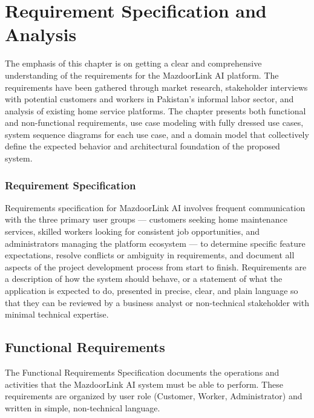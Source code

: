 \documentclass[12pt,a4paper]{report}
\begin{document}
\chapter{Requirement Specification and Analysis}

The emphasis of this chapter is on getting a clear and comprehensive understanding
of the requirements for the MazdoorLink AI platform. The requirements have been
gathered through market research, stakeholder interviews with potential customers
and workers in Pakistan's informal labor sector, and analysis of existing home
service platforms. The chapter presents both functional and non-functional
requirements, use case modeling with fully dressed use cases, system sequence
diagrams for each use case, and a domain model that collectively define the
expected behavior and architectural foundation of the proposed system.

\subsection*{Requirement Specification}

Requirements specification for MazdoorLink AI involves frequent communication
with the three primary user groups --- customers seeking home maintenance
services, skilled workers looking for consistent job opportunities, and
administrators managing the platform ecosystem --- to determine specific feature
expectations, resolve conflicts or ambiguity in requirements, and document all
aspects of the project development process from start to finish. Requirements are
a description of how the system should behave, or a statement of what the
application is expected to do, presented in precise, clear, and plain language so
that they can be reviewed by a business analyst or non-technical stakeholder with
minimal technical expertise.

\newpage

\section{Functional Requirements}

The Functional Requirements Specification documents the operations and activities that the MazdoorLink AI system must be able to perform. These requirements are organized by user role (Customer, Worker, Administrator) and written in simple, non-technical language.
\end{document}
